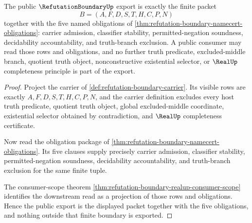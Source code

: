 \begin{theorem}
\label{thm:refutation-boundary-public-export}
The public $\RefutationBoundaryUp$ export is exactly the finite packet
$$
B=(A,F,D,S,T,H,C,P,N)
$$
together with the five named obligations of \autoref{thm:refutation-boundary-namecert-obligations}: carrier admission, classifier stability, permitted-negation soundness, decidability accountability, and truth-branch exclusion. A public consumer may read those rows and obligations, and no further truth predicate, excluded-middle branch, quotient truth object, nonconstructive existential selector, or $\RealUp$ completeness principle is part of the export.
\end{theorem}
\begin{proof}
Project the carrier of \autoref{def:refutation-boundary-carrier}. Its visible rows are exactly $A,F,D,S,T,H,C,P,N$, and the carrier definition excludes every host truth predicate, quotient truth object, global excluded-middle coordinate, existential selector obtained by contradiction, and $\RealUp$ completeness certificate.

Now read the obligation package of \autoref{thm:refutation-boundary-namecert-obligations}. Its five clauses supply precisely carrier admission, classifier stability, permitted-negation soundness, decidability accountability, and truth-branch exclusion for the same finite tuple.

The consumer-scope theorem \autoref{thm:refutation-boundary-realup-consumer-scope} identifies the downstream read as a projection of those rows and obligations. Hence the public export is the displayed packet together with the five obligations, and nothing outside that finite boundary is exported.
\end{proof}

